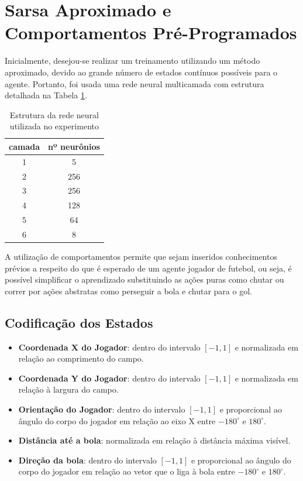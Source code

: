 \section{Sarsa Aproximado e Comportamentos Pré-Programados}
\label{subsec:sarsadev}
\par Inicialmente, desejou-se realizar um treinamento utilizando um método aproximado, devido ao grande número de estados contínuos possíveis para o agente. Portanto, foi usada uma rede neural multicamada com estrutura detalhada na Tabela \ref{table:ann}.

\begin{table}[h]
	\centering
	\begin{tabular}{||c c||} 
		\hline
		camada & nº neurônios  \\ [0.5ex] 
		\hline\hline
		1 & 5  \\ 
		\hline
		2 &  256 \\
		\hline
		3 & 256 \\
		\hline
		4 & 128  \\
		\hline
		5 & 64 \\ 
		\hline
		6 & 8 \\ [1ex] 
		\hline
	\end{tabular}
	\caption{Estrutura da rede neural utilizada no experimento}
	\label{table:ann}
\end{table}

A utilização de comportamentos permite que sejam inseridos conhecimentos prévios a respeito do que é esperado de um agente jogador de futebol, ou seja, é possível simplificar o aprendizado substituindo as ações puras como chutar ou correr por ações abstratas como perseguir a bola e chutar para o gol.

\subsection{Codificação dos Estados}
\label{subsubsec:state-approx}
\begin{itemize}
	\item \textbf{Coordenada X do Jogador}: dentro do intervalo $[-1, 1]$ e normalizada em relação ao comprimento do campo.
	\item \textbf{Coordenada Y do Jogador}: dentro do intervalo $[-1, 1]$ e normalizada em relação à largura do campo.
	\item \textbf{Orientação do Jogador}: dentro do intervalo $[-1, 1]$ e proporcional ao ângulo do corpo do jogador em relação ao eixo X entre $-180^{\circ}$ e $180^{\circ}$.
	\item \textbf{Distância até a bola}: normalizada em relação à distância máxima visível.
	\item \textbf{Direção da bola}: dentro do intervalo $[-1, 1]$ e proporcional ao ângulo do corpo do jogador em relação ao vetor que o liga à bola entre $-180^{\circ}$ e $180^{\circ}$. 
	
\end{itemize}

